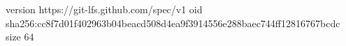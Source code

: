 version https://git-lfs.github.com/spec/v1
oid sha256:cc8f7d01f402963b04beacd508d4ea9f3914556e288baec744ff12816767bcdc
size 64

